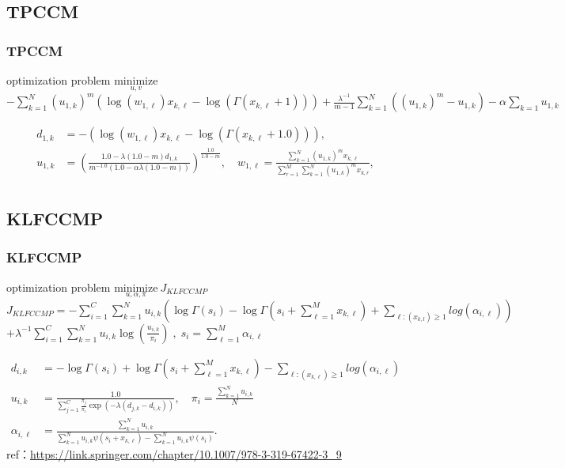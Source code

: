 \documentclass[fleqn,dvipdfmx,10pt]{beamer}
\begin{document}
\subsection{TPCCM}
\begin{frame}\frametitle{TPCCM}
  \begin{block}{optimization problem}
    $\underset{u,v}{\text{minimize}}$
    $-\sum_{k=1}^N(u_{1,k})^m\left(\log(w_{1,\ell})x_{k,\ell}-\log(\Gamma(x_{k,\ell}+1))\right)+\frac{\lambda^{-1}}{m-1}\sum_{k=1}^N\left((u_{1,k})^m-u_{1,k}\right)-\alpha\sum_{k=1}u_{1,k}$\centering\\
  \end{block}
  \begin{align*}
    d_{1,k}&=-\left(\log(w_{1,\ell})x_{k,\ell}-\log(\Gamma(x_{k,\ell}+1.0))\right),\\
    u_{1,k}&=\left(\frac{1.0-\lambda(1.0-m)d_{1,k}}{m^{-1.0}\left(1.0-\alpha\lambda(1.0-m)\right)}\right)^{\frac{1.0}{1.0-m}},\quad
    w_{1,\ell}=\frac{\sum_{k=1}^N (u_{1,k})^m x_{k,\ell}}{\sum_{r=1}^M\sum_{k=1}^N(u_{1,k})^m x_{k,r}},\\
  \end{align*}
\end{frame}

\subsection{KLFCCMP}
\begin{frame}\frametitle{KLFCCMP}
  \begin{block}{optimization problem}
    $\underset{u,\alpha,\pi}{\text{minimize}}~J_{KLFCCMP}$\\
    $J_{KLFCCMP}=-\sum_{i=1}^C\sum_{k=1}^N u_{i,k} \left(\log\Gamma(s_i)-\log\Gamma(s_i+\sum_{\ell=1}^M x_{k,\ell})+\sum_{\ell:(x_{k,l})\geq1} log(\alpha_{i,\ell})\right)$\\$+\lambda^{-1}\sum_{i=1}^C\sum_{k=1}^N u_{i,k}\log(\frac{u_{i,k}}{\pi_i})\;,\;s_i=\sum_{\ell=1}^M \alpha_{i,\ell}$\centering 	%
  \end{block}
  \begin{align*}
    d_{i,k}&=-\log\Gamma(s_i)+\log\Gamma(s_i+\sum_{\ell=1}^M x_{k,\ell})-\sum_{\ell:(x_{k,\ell})\geq1} log(\alpha_{i,\ell})\\
    u_{i,k}&=\frac{1.0}{\sum_{j=1}^C \frac{\pi_{j}}{\pi_i}\exp(-\lambda(d_{j,k}-d_{i,k}))},\quad
    \pi_i=\frac{\sum_{k=1}^N u_{i,k}}{N}\\
    \alpha_{i,\ell}&=\frac{\sum_{k=1}^N u_{i,k}}{\sum_{k=1}^N u_{i,k} \psi(s_i+x_{k,\ell})-\sum_{k=1}^N u_{i,k}\psi(s_i)}.
  \end{align*}
   ref：\url{https://link.springer.com/chapter/10.1007/978-3-319-67422-3_9}
\end{frame}
\end{document}
